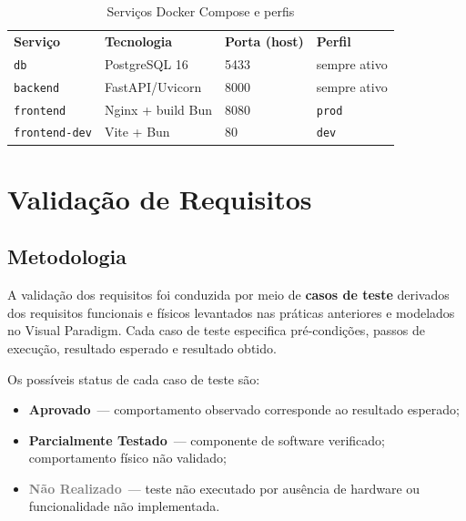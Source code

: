 \documentclass[12pt,a4paper]{article}
\newcommand{\lightrule}{\arrayrulecolor{gray!35}\midrule\arrayrulecolor{black}}
\newcommand{\aprovado}{\textcolor{green!60!black}{\textbf{Aprovado}}}
\newcommand{\parcial}{\textcolor{orange!80!black}{\textbf{Parcialmente Testado}}}
\newcommand{\naorealizado}{\textcolor{gray}{\textbf{Não Realizado}}}
\begin{document}
\begin{table}[H]
    \centering
    \caption{Serviços Docker Compose e perfis}
    \label{tab:docker}
    \begin{tabularx}{\textwidth}{lXll}
        \toprule
        \textbf{Serviço}              & \textbf{Tecnologia}  & \textbf{Porta (host)} & \textbf{Perfil} \\
        \lightrule
        \texttt{db}                   & PostgreSQL 16        & 5433                  & sempre ativo \\
        \lightrule
        \texttt{backend}              & FastAPI/Uvicorn      & 8000                  & sempre ativo \\
        \lightrule
        \texttt{frontend}             & Nginx + build Bun    & 8080                  & \texttt{prod} \\
        \lightrule
        \texttt{frontend-dev}         & Vite + Bun           & 80                    & \texttt{dev} \\
        \bottomrule
    \end{tabularx}
\end{table}

\newpage

\section{Validação de Requisitos}

\subsection{Metodologia}

A validação dos requisitos foi conduzida por meio de \textbf{casos de teste} derivados dos requisitos funcionais e físicos levantados nas práticas anteriores e modelados no Visual Paradigm. Cada caso de teste especifica pré-condições, passos de execução, resultado esperado e resultado obtido.

Os possíveis status de cada caso de teste são:

\begin{itemize}
    \item \aprovado\ — comportamento observado corresponde ao resultado esperado;
    \item \parcial\ — componente de software verificado; comportamento físico não validado;
    \item \naorealizado\ — teste não executado por ausência de hardware ou funcionalidade não implementada.
\end{itemize}
\end{document}
